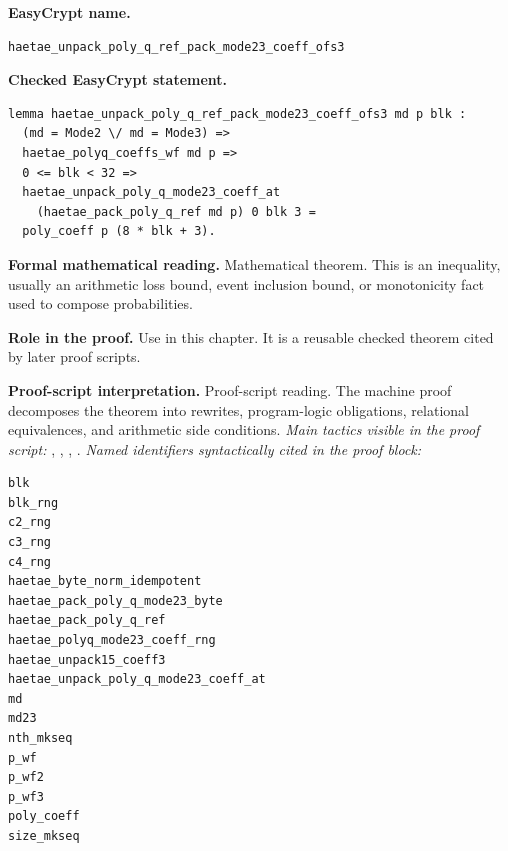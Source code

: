 \begin{formaltheorem}
\noindent\textbf{EasyCrypt name.}
\begin{lstlisting}[language=EasyCrypt,basicstyle=\ttfamily\scriptsize]
haetae_unpack_poly_q_ref_pack_mode23_coeff_ofs3
\end{lstlisting}
\noindent\textbf{Checked EasyCrypt statement.}
\begin{lstlisting}[language=EasyCrypt,basicstyle=\ttfamily\scriptsize]
lemma haetae_unpack_poly_q_ref_pack_mode23_coeff_ofs3 md p blk :
  (md = Mode2 \/ md = Mode3) =>
  haetae_polyq_coeffs_wf md p =>
  0 <= blk < 32 =>
  haetae_unpack_poly_q_mode23_coeff_at
    (haetae_pack_poly_q_ref md p) 0 blk 3 =
  poly_coeff p (8 * blk + 3).
\end{lstlisting}
\noindent\textbf{Formal mathematical reading.}
Mathematical theorem. This is an inequality, usually an arithmetic loss bound, event inclusion bound, or monotonicity fact used to compose probabilities.

\noindent\textbf{Role in the proof.}
Use in this chapter. It is a reusable checked theorem cited by later proof scripts.

\noindent\textbf{Proof-script interpretation.}
Proof-script reading. The machine proof decomposes the theorem into rewrites, program-logic obligations, relational equivalences, and arithmetic side conditions.
\emph{Main tactics visible in the proof script:} , , , .
\emph{Named identifiers syntactically cited in the proof block:}
\begin{lstlisting}[language=EasyCrypt,basicstyle=\ttfamily\scriptsize]
blk
blk_rng
c2_rng
c3_rng
c4_rng
haetae_byte_norm_idempotent
haetae_pack_poly_q_mode23_byte
haetae_pack_poly_q_ref
haetae_polyq_mode23_coeff_rng
haetae_unpack15_coeff3
haetae_unpack_poly_q_mode23_coeff_at
md
md23
nth_mkseq
p_wf
p_wf2
p_wf3
poly_coeff
size_mkseq
\end{lstlisting}

\end{formaltheorem}

